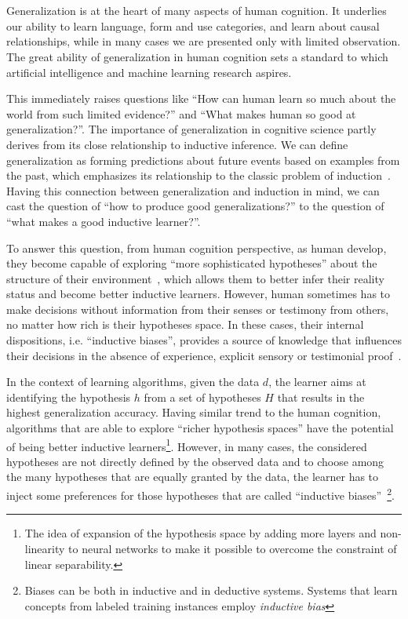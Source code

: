 \part{}
\label{part3}
Generalization is at the heart of many aspects of human cognition. It underlies our ability to learn language, form and use categories, and learn about causal relationships, while in many cases we are presented only with limited observation. The great ability of generalization in human cognition sets a standard to which artificial intelligence and machine learning research aspires.

This immediately raises questions like ``How can human learn so much about the world from such limited evidence?'' and ``What makes human so good at generalization?''.
The importance of generalization in cognitive science partly derives
from its close relationship to inductive inference.  We can define generalization as forming predictions about future events based on examples from the past, which emphasizes its relationship to the classic problem of induction~\citep{hume2003treatise}. 
Having this connection between generalization and induction in mind, we can cast the question of ``how to produce good generalizations?'' to the question of ``what makes a good inductive learner?''.

To answer this question, from human cognition perspective, as human develop, they become capable of exploring ``more sophisticated hypotheses'' about the structure of their environment~\citep{inhelder1958growth}, which allows them to better infer their reality status and become better inductive learners. However, human sometimes has to make decisions without information from their senses or testimony from others, no matter how rich is their hypotheses space.
In these cases, their internal dispositions, i.e. ``inductive biases'', provides a source of knowledge that influences their decisions in the absence of experience, explicit sensory or testimonial proof~\cite{sodian1987children,griffiths2010probabilistic}.

In the context of learning algorithms, given the data $d$, the learner aims at identifying the hypothesis $h$ from a set of hypotheses $H$ that results in the highest generalization accuracy.  Having similar trend to the human cognition, algorithms that are able to explore ``richer hypothesis spaces'' have the potential of being better inductive learners\footnote{The idea of expansion of the hypothesis space by adding more layers and non-linearity to neural networks to make it possible to overcome the constraint of linear separability.}. However, in many cases, the considered hypotheses are not directly defined by the observed data and to choose among the many hypotheses that are equally granted by the data, the learner has to inject some preferences for those hypotheses that are called ``inductive biases''~\footnote{Biases can be both in inductive and in deductive systems. Systems that learn concepts from labeled training instances employ \emph{inductive bias}}. 

